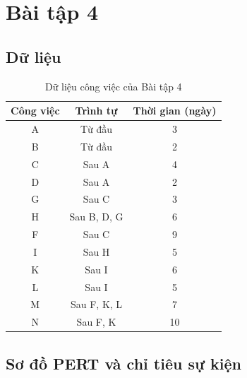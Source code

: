 \section{Bài tập 4}

\subsection{Dữ liệu}

\begin{table}[H]\centering
\caption{Dữ liệu công việc của Bài tập 4}
\begin{tabular}{c c c}
\toprule
\textbf{Công việc} & \textbf{Trình tự} & \textbf{Thời gian (ngày)}\\
\midrule
A & Từ đầu & 3\\
B & Từ đầu & 2\\
C & Sau A & 4\\
D & Sau A & 2\\
G & Sau C & 3\\
H & Sau B, D, G & 6\\
F & Sau C & 9\\
I & Sau H & 5\\
K & Sau I & 6\\
L & Sau I & 5\\
M & Sau F, K, L & 7\\
N & Sau F, K & 10\\
\bottomrule
\end{tabular}
\end{table}

\subsection{Sơ đồ PERT và chỉ tiêu sự kiện}


